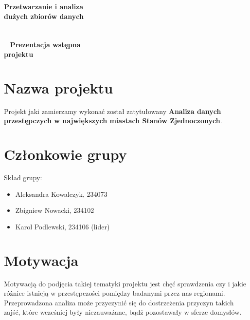 \documentclass[a4paper,11pt]{article}
\begin{document}
\begin{titlepage}
\begin{center}
\textbf{\Huge{Przetwarzanie i analiza\\}}
\textbf{\Huge{dużych zbiorów danych\\~\\~\\~}}
\textbf{\Huge{Prezentacja wstępna\\projektu}}
\end{center}

\end{titlepage}
\setcounter{page}{2}

\tableofcontents
{}
\newpage


\section{Nazwa projektu} \label{sec:nazwa}

Projekt jaki zamierzamy wykonać został zatytułowany \textbf{Analiza danych przestępczych w największych miastach Stanów Zjednoczonych}.


\section{Członkowie grupy} \label{sec:grupa}
Skład grupy:
\begin{itemize}
    \item Aleksandra Kowalczyk, 234073
    \item Zbigniew Nowacki, 234102
    \item Karol Podlewski, 234106 (lider)
\end{itemize}


\section{Motywacja} \label{sec:motywacja}

Motywacją do podjęcia takiej tematyki projektu jest chęć sprawdzenia czy i jakie różnice istnieją w przestępczości pomiędzy badanymi przez nas regionami. Przeprowadzona analiza może przyczynić się do dostrzeżenia przyczyn takich zajść, które wcześniej były niezauważane, bądź pozostawały w sferze domysłów.
\end{document}
